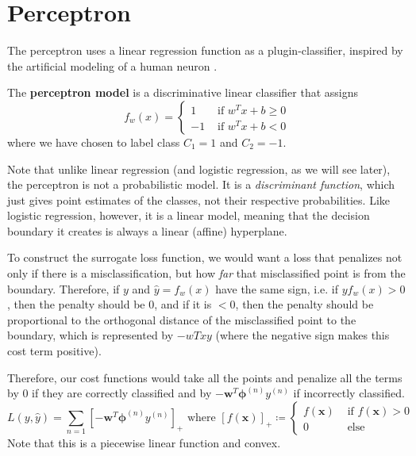\section{Perceptron} 

  The perceptron uses a linear regression function as a plugin-classifier, inspired by the artificial modeling of a human neuron \cite{1943mcculloch}. 

  \begin{definition}[Perceptron]
    \label{def:perceptron}
    The \textbf{perceptron model} is a discriminative linear classifier that assigns 
    \begin{equation}
      f_w (x) = \begin{cases} 1 & \text{ if } w^T x + b \geq 0 \\ -1 & \text { if } w^T x + b < 0 \end{cases}
    \end{equation}
    where we have chosen to label class $C_1 = 1$ and $C_2 = -1$. 
  \end{definition}

  Note that unlike linear regression (and logistic regression, as we will see later), the perceptron is not a probabilistic model. It is a \textit{discriminant function}, which just gives point estimates of the classes, not their respective probabilities. Like logistic regression, however, it is a linear model, meaning that the decision boundary it creates is always a linear (affine) hyperplane. 

  To construct the surrogate loss function, we would want a loss that penalizes not only if there is a misclassification, but how \textit{far} that misclassified point is from the boundary. Therefore, if $y$ and $\hat{y} = f_w (x)$ have the same sign, i.e. if $y f_w (x) > 0$, then the penalty should be $0$, and if it is $< 0$, then the penalty should be proportional to the orthogonal distance of the misclassified point to the boundary, which is represented by $-wT x y$ (where the negative sign makes this cost term positive). 

  \begin{definition}
    \label{def:surrogate-loss-for-perceptron}
    Therefore, our cost functions would take all the points and penalize all the terms by $0$ if they are correctly classified and by $-\mathbf{w}^T \boldsymbol{\phi}^{(n)} y^{(n)}$ if incorrectly classified. 
    \begin{equation}
      L(y, \hat{y}) = \sum_{n=1} [ -\mathbf{w}^T \boldsymbol{\phi}^{(n)} y^{(n)} ]_+ \text{ where } [f(\mathbf{x})]_+ \coloneqq \begin{cases} f(\mathbf{x}) & \text{ if } f(\mathbf{x}) > 0 \\ 0 & \text{ else } \end{cases}
    \end{equation}
    Note that this is a piecewise linear function and convex. 
  \end{definition}

